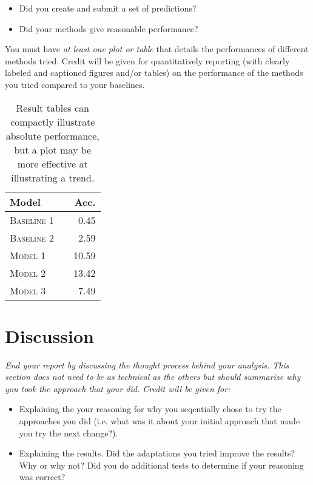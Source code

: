 \documentclass[11pt]{article}
\begin{document}
{\itshape
\begin{itemize}
\item Did you create and submit a set of
  predictions? 
  

\item  Did your methods give reasonable performance?  
\end{itemize}

\noindent You must have \textit{at least one plot or table}
that details the performances of different methods tried. 
Credit will be given for quantitatively reporting (with clearly
labeled and captioned figures and/or tables) on the performance of the
methods you tried compared to your baselines.



\begin{table}
\centering
\begin{tabular}{llr}
 \toprule
 Model &  & Acc. \\
 \midrule
 \textsc{Baseline 1} & & 0.45\\
 \textsc{Baseline 2} & & 2.59 \\
 \textsc{Model 1} & & 10.59  \\
 \textsc{Model 2} & &13.42 \\
 \textsc{Model 3} & & 7.49\\
 \bottomrule
\end{tabular}
\caption{\label{tab:results} Result tables can compactly illustrate absolute performance, but a plot may be more effective at illustrating a trend.}
\end{table}
}



\section{Discussion} 

{\itshape
End your report by discussing the thought process behind your
analysis. This section does not need to be as technical as the others 
but should summarize why you took the approach that your did. Credit will be given for:

  \begin{itemize}
  \item Explaining the your reasoning for why you seqentially chose to
    try the approaches you did (i.e. what was it about your initial
    approach that made you try the next change?).  
  \item Explaining the results.  Did the adaptations you tried improve
    the results?  Why or why not?  Did you do additional tests to
    determine if your reasoning was correct?  
  \end{itemize}
 }
\end{document}
